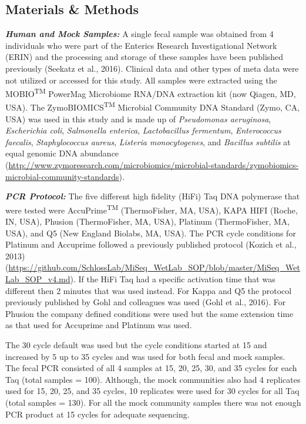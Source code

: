 \documentclass[12pt,]{article}
\begin{document}
\newpage

\subsection{Materials \& Methods}\label{materials-methods}

\textbf{\emph{Human and Mock Samples:}} A single fecal sample was
obtained from 4 individuals who were part of the Enterics Research
Investigational Network (ERIN) and the processing and storage of these
samples have been published previously (Seekatz et al., 2016). Clinical
data and other types of meta data were not utilized or accessed for this
study. All samples were extracted using the MOBIO\textsuperscript{TM}
PowerMag Microbiome RNA/DNA extraction kit (now Qiagen, MD, USA). The
ZymoBIOMICS\textsuperscript{TM} Microbial Community DNA Standard (Zymo,
CA, USA) was used in this study and is made up of \emph{Pseudomonas
aeruginosa}, \emph{Escherichia coli}, \emph{Salmonella enterica},
\emph{Lactobacillus fermentum}, \emph{Enterococcus faecalis},
\emph{Staphylococcus aureus}, \emph{Listeria monocytogenes}, and
\emph{Bacillus subtilis} at equal genomic DNA abundance
(\url{http://www.zymoresearch.com/microbiomics/microbial-standards/zymobiomics-microbial-community-standards}).

\textbf{\emph{PCR Protocol:}} The five different high fidelity (HiFi)
Taq DNA polymerase that were tested were AccuPrime\textsuperscript{TM}
(ThermoFisher, MA, USA), KAPA HIFI (Roche, IN, USA), Phusion
(ThermoFisher, MA, USA), Platinum (ThermoFisher, MA, USA), and Q5 (New
England Biolabs, MA, USA). The PCR cycle conditions for Platinum and
Accuprime followed a previously published protocol (Kozich et al., 2013)
(\url{https://github.com/SchlossLab/MiSeq_WetLab_SOP/blob/master/MiSeq_WetLab_SOP_v4.md}).
If the HiFi Taq had a specific activation time that was different then 2
minutes that was used instead. For Kappa and Q5 the protocol previously
published by Gohl and colleagues was used (Gohl et al., 2016). For
Phusion the company defined conditions were used but the same extension
time as that used for Accuprime and Platinum was used.

The 30 cycle default was used but the cycle conditions started at 15 and
increased by 5 up to 35 cycles and was used for both fecal and mock
samples. The fecal PCR consisted of all 4 samples at 15, 20, 25, 30, and
35 cycles for each Taq (total samples = 100). Although, the mock
communities also had 4 replicates used for 15, 20, 25, and 35 cycles, 10
replicates were used for 30 cycles for all Taq (total samples = 130).
For all the mock community samples there was not enough PCR product at
15 cycles for adequate sequencing.
\end{document}
